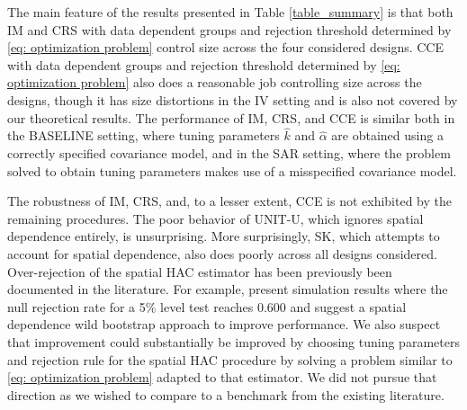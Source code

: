 \documentclass[preprint]{imsart}
\numberwithin{equation}{section}
\theoremstyle{plain}
\theoremstyle{definition}
\renewcommand{\(}{\left(}
\renewcommand{\)}{\right)}
\renewcommand{\[}{\left[}
\renewcommand{\]}{\right]}
\renewcommand{\hat}{\widehat}
\newcommand{\G}{k}
\renewcommand{\hat}{\widehat}
\begin{document}

The main feature of the results presented in Table \ref{table_summary} is that both IM and CRS with data dependent groups and rejection threshold determined by \eqref{eq: optimization problem} control size across the four considered designs. CCE with data dependent groups and rejection threshold determined by \eqref{eq: optimization problem} also does a reasonable job controlling size across the designs, though it has size distortions in the IV setting and is also not covered by our theoretical results. The performance of IM, CRS, and CCE is similar both in the BASELINE setting, where tuning parameters $\hat\G$ and $\hat\alpha$ are obtained using a correctly specified covariance model, and in the SAR setting, where the problem solved to obtain tuning parameters makes use of a misspecified covariance model.

The robustness of IM, CRS, and, to a lesser extent, CCE is not exhibited by the remaining procedures. The poor behavior of UNIT-U, which ignores spatial dependence entirely, is unsurprising. More surprisingly, SK, which attempts to account for spatial dependence, also does poorly across all designs considered. Over-rejection of the spatial HAC estimator has been previously been documented in the literature. For example, \cite{Conley:Goncalves:Kim:Perron:boot} present simulation results where the null rejection rate for a 5\% level test reaches 0.600 and suggest a spatial dependence wild bootstrap approach to improve performance. We also suspect that improvement could substantially be improved by choosing tuning parameters and rejection rule for the spatial HAC procedure by solving a problem similar to \eqref{eq: optimization problem} adapted to that estimator. We did not pursue that direction as we wished to compare to a benchmark from the existing literature.
\end{document}
